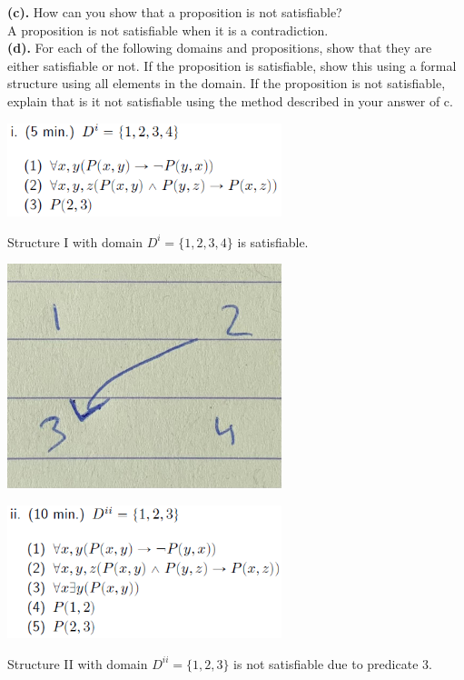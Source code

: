 \documentclass[a4paper]{article}
\begin{document}
\textbf{(c).} How can you show that a proposition is not satisfiable?\\
A proposition is not satisfiable when it is a contradiction.\\

\textbf{(d).} For each of the following domains and propositions, show that they are either satisfiable or not. If
the proposition is satisfiable, show this using a formal structure using all elements in the domain. If
the proposition is not satisfiable, explain that is it not satisfiable using the method described in your
answer of c.\\

\begin{center}
    \includegraphics[width=0.6\textwidth]{images/4d1.png}\\[1cm]
\end{center}
Structure I with domain $D^i = \{1,2,3,4\}$ is satisfiable.

\begin{center}
    \includegraphics[width=0.6\textwidth]{images/4d1a.jpeg}\\[1cm]
\end{center}

\newpage

\begin{center}
    \includegraphics[width=0.6\textwidth]{images/4d2.png}\\[1cm]
\end{center}
Structure II with domain $D^{ii} = \{1,2,3\}$ is not satisfiable due to predicate 3.
\end{document}
